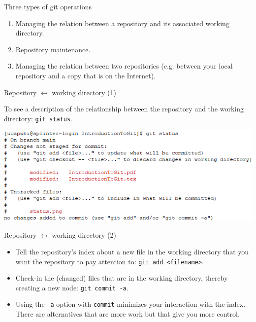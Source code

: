 \documentclass[usenames,dvipsnames]{beamer}
\newcommand{\code}[1]{\colorbox{light-gray}{\texttt{#1}}}
\begin{document}
\begin{frame}{Three types of git operations}
  \begin{block}{}
    \begin{enumerate}
      \item{Managing the relation between a repository and its associated working directory.}
      \item{Repository maintenance.}
      \item{Managing the relation between two repositories (e.g. between your local repository and a copy that is on the Internet).}
    \end{enumerate}
  \end{block}
\end{frame}

\begin{frame}{Repository $\leftrightarrow$ working directory (1)}
  \begin{block}{}
    To see a description of the relationship between the repository and the working directory: \code{git status}.
    \begin{center}
      \includegraphics[scale=0.7]{status.png}
    \end{center}
  \end{block}
\end{frame}

\begin{frame}{Repository $\leftrightarrow$ working directory (2)}
  \begin{block}{}
    \begin{itemize}
      \item{Tell the repository's index about a new file in the working directory that you want the repository to pay attention to: \code{git add <filename>}.}
      \item{Check-in the (changed) files that are in the working directory, thereby creating a new node: \code{git commit -a}.}
      \item{Using the \code{-a} option with \code{commit} minimizes your interaction with the index. There are alternatives that are more work but that give you more control.}
    \end{itemize}
  \end{block}
\end{frame}
\end{document}
